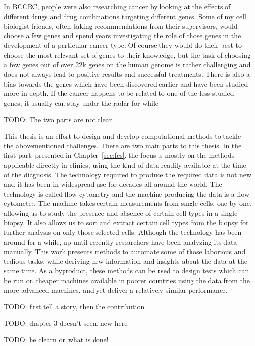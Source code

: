 In BCCRC, people were also researching cancer by looking at the effects of
different drugs and drug combinations targeting different genes. Some of my cell
biologist friends, often taking recommendations from their supervisors, would
choose a few genes and spend years investigating the role of those genes in the
development of a particular cancer type. Of course they would do their best to
choose the most relevant set of genes to their knowledge, but the task of
choosing a few genes out of over 22k genes on the human genome is rather
challenging and does not always lead to positive results and successful
treatments. There is also a bias towards the genes which have been discovered
earlier and have been studied more in depth. If the cancer happens to be related
to one of the less studied genes, it usually can stay under the radar for while.

TODO: The two parts are not clear

This thesis is an effort to design and develop computational methods to tackle
the abovementioned challenges. There are two main parts to this thesis. In the
first part, presented in Chapter~\ref{sec:fcs}, the focus is mostly on the
methods applicable directly in clinics, using the kind of data readily available
at the time of the diagnosis. The technology required to produce the required
data is not new and it has been in widespread use for decades all around the
world. The technology is called flow cytometry and the machine producing the
data is a flow cytometer. The machine takes certain measurements from single
cells, one by one, allowing us to study the presence and absence of certain cell
types in a single biopsy. It also allows us to sort and extract certain cell
types from the biopsy for further analysis on only those selected cells.
Although the technology has been around for a while, up until recently
researchers have been analyzing its data manually. This work presents methods to
automate some of those laborious and tedious tasks, while deriving new
information and insights about the data at the same time. As a byproduct, these
methods can be used to design tests which can be run on cheaper machines
available in poorer countries using the data from the more advanced machines,
and yet deliver a relatively similar performance.

TODO: first tell a story, then the contribution

TODO: chapter 3 doesn't seem new here.

TODO: be clearn on what is done!

